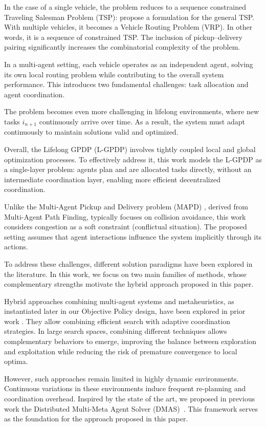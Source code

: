 \documentclass[sigconf]{acmart}
\begin{document}
In the case of a single vehicle, the problem reduces to a sequence constrained Traveling Salesman Problem (TSP): \cite{miller1960} propose a formulation for the general TSP. With multiple vehicles, it becomes a Vehicle Routing Problem (VRP). In other words, it is a sequence of constrained TSP. The inclusion of pickup--delivery pairing significantly increases the combinatorial complexity of the problem.

In a multi-agent setting, each vehicle operates as an independent agent, solving its own local routing problem while contributing to the overall system performance. This introduces two fundamental challenges: task allocation and agent coordination.

The problem becomes even more challenging in lifelong environments, where new tasks $i_{n+1}$ continuously arrive over time. As a result, the system must adapt continuously to maintain solutions valid and optimized.

Overall, the Lifelong GPDP (L-GPDP) involves tightly coupled local and global optimization processes. To effectively address it, this work models the L-GPDP as a single-layer problem: agents plan and are allocated tasks directly, without an intermediate coordination layer, enabling more efficient decentralized coordination.

Unlike the Multi-Agent Pickup and Delivery problem (MAPD) \cite{stern2019}, derived from Multi-Agent Path Finding, typically focuses on collision avoidance, this work considers congestion as a soft constraint (conflictual situation). The proposed setting assumes that agent interactions influence the system implicitly through its actions.

To address these challenges, different solution paradigms have been explored in the literature. In this work, we focus on two main families of methods, whose complementary strengths motivate the hybrid approach proposed in this paper.

Hybrid approaches combining multi-agent systems and metaheuristics, as instantiated later in our Objective Policy design, have been explored in prior work \cite{crepin2025}. They allow combining efficient search with adaptive coordination strategies. In large search spaces, combining different techniques allows complementary behaviors to emerge, improving the balance between exploration and exploitation while reducing the risk of premature convergence to local optima.

However, such approaches remain limited in highly dynamic environments. Continuous variations in these environments induce frequent re-planning and coordination overhead. Inspired by the state of the art, we proposed in previous work the Distributed Multi-Meta Agent Solver (DMAS)~\cite{crepin2026}. This framework serves as the foundation for the approach proposed in this paper.
\end{document}
